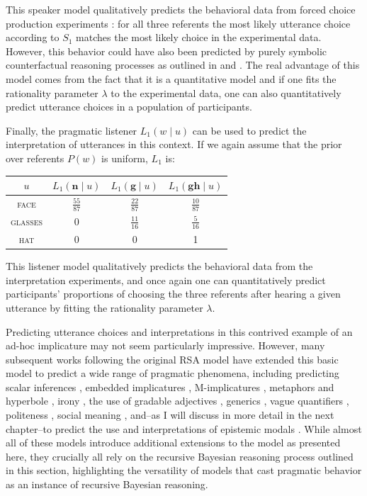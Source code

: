 \noindent This speaker model qualitatively predicts the behavioral data from forced choice production experiments \cite{Goodman2016}: for all three
referents the most likely utterance choice according to $S_1$ matches the most likely choice in the experimental data. However, this behavior could have
also been predicted by purely symbolic counterfactual reasoning processes as outlined in \textcite{Grice1975} and \textcite{Hirschberg1985}. The real advantage of this model 
comes from the fact that it is a quantitative model and if one fits the rationality parameter $\lambda$ to the experimental data, one can also quantitatively predict 
utterance choices in a population of participants.

Finally, the pragmatic listener $L_1(w \mid u)$ can be used to predict the interpretation of utterances in this context. If we again assume that the prior over referents $P(w)$
is uniform, $L_1$ is:

\begin{center}
\begin{tabular}{c | c | c | c} 
$u$ & $L_1( \mathbf{n} \mid u)$ &  $L_1( \mathbf{g} \mid u)$ &  $L_1( \mathbf{gh} \mid u)$ \\ \midrule
\textsc{face} & $\frac{55}{87}$ & $\frac{22}{87}$ & $\frac{10}{87}$  \\
\textsc{glasses} &0  & $\frac{11}{16}$ & $\frac{5}{16}$  \\
\textsc{hat} & 0 & 0 & 1 \\
\end{tabular}
\end{center}

\noindent This listener model qualitatively predicts the behavioral data from the interpretation experiments, and once again one can quantitatively predict participants' proportions
of choosing the three referents after hearing a given utterance by fitting the rationality parameter $\lambda$. 

Predicting utterance choices and interpretations in this contrived example of an ad-hoc implicature may not seem particularly impressive. However, many subsequent works
following the original RSA model have extended this basic model to predict a wide range of pragmatic phenomena, including predicting scalar inferences 
\cite{Goodman2013}, embedded implicatures \cite{Potts2016}, M-implicatures \cite{Bergen2016}, metaphors and hyperbole \cite{Kao2014a,Kao2014b}, 
irony \cite{Kao2015,CohnGordon2019}, the use of gradable adjectives \cite{Lassiter2017b, Qing2015}, generics \cite{Tessler2019}, vague quantifiers 
\cite{Scholler2017}, politeness \cite{Yoon2018}, social meaning \cite{Burnett2019}, and--as I will discuss in more detail in the next chapter--to 
predict the use and interpretations of epistemic modals \cite{Herbstritt2019}. While almost all of these models 
introduce additional extensions to the model as presented here, they crucially all rely on the recursive Bayesian reasoning process outlined in this section,
highlighting the versatility of models that cast pragmatic behavior as an instance of recursive Bayesian reasoning.





